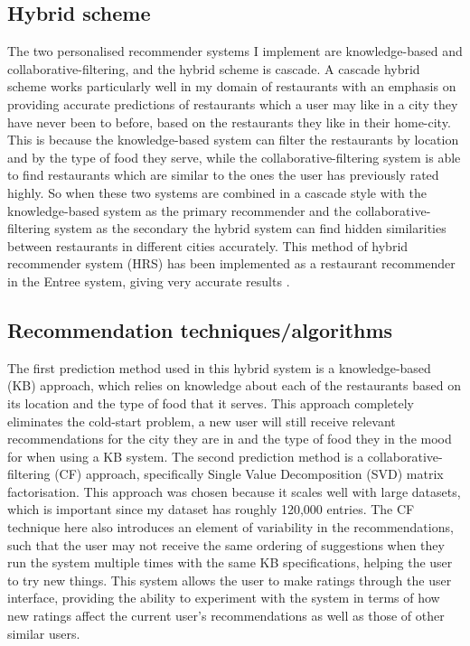 \documentclass[conference]{IEEEtran}
\begin{document}
\subsection{Hybrid scheme}
The two personalised recommender systems I implement are knowledge-based and collaborative-filtering, and 
the hybrid scheme is cascade. 
A cascade hybrid scheme works particularly well in my domain of restaurants with an emphasis on providing accurate 
predictions of restaurants which a user may like in a city they have never been to before, based on the restaurants 
they like in their home-city. 
This is because the knowledge-based system can filter the restaurants by location and by the type of food they serve, 
while the collaborative-filtering system is able to find restaurants which are similar to the ones the user has 
previously rated highly. 
So when these two systems are combined in a cascade style with the knowledge-based system as the primary recommender 
and the collaborative-filtering system as the secondary the hybrid system can find hidden similarities between 
restaurants in different cities accurately. 
This method of hybrid recommender system (HRS) has been implemented as a restaurant recommender in the Entree 
system, giving very accurate results \cite{burke1999integrating,burke2000knowledge,burke2002hybrid,burke2007hybrid}. 

\subsection{Recommendation techniques/algorithms}
The first prediction method used in this hybrid system is a knowledge-based (KB) approach, which relies on knowledge 
about each of the restaurants based on its location and the type of food that it serves. 
This approach completely eliminates the cold-start problem, a new user will still receive relevant recommendations 
for the city they are in and the type of food they in the mood for when using a KB system. 
The second prediction method is a collaborative-filtering (CF) approach, specifically Single Value Decomposition (SVD) 
matrix factorisation. 
This approach was chosen because it scales well with large datasets, which is important since my dataset has 
roughly 120,000 entries. 
The CF technique here also introduces an element of variability in the recommendations, such that the user 
may not receive the same ordering of suggestions when they run the system multiple times with the same 
KB specifications, helping the user to try new things. 
This system allows the user to make ratings through the user interface, providing the ability to experiment with 
the system in terms of how new ratings affect the current user's recommendations as well as those of other similar users. 
\end{document}
